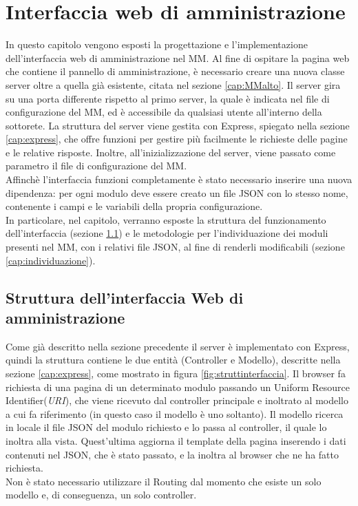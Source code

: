\chapter{Interfaccia web di amministrazione}\label{capitolo5}
In questo capitolo vengono esposti la progettazione e l'implementazione dell'interfaccia web di amministrazione
nel MM.
Al fine di ospitare la pagina web che contiene il pannello di amministrazione, \`e necessario
creare una nuova classe server oltre a quella gi\`a esistente, citata nel sezione \ref{cap:MMalto}.
Il server gira su una porta differente rispetto al primo server, la quale è indicata nel file di configurazione del MM,
ed \`e accessibile da qualsiasi utente all'interno della sottorete.
La struttura del server viene gestita con Express, spiegato nella sezione \ref{cap:express}, che offre funzioni per gestire
pi\`u facilmente le richieste delle pagine e le relative risposte.
Inoltre, all'inizializzazione del server, viene passato come parametro il file di configurazione del
MM.\\
Affinch\`e l'interfaccia funzioni completamente \`e stato necessario inserire una nuova dipendenza:
per ogni modulo deve essere creato un file JSON con lo stesso nome,
contenente i campi e le variabili della propria configurazione.\\
In particolare, nel capitolo, verranno esposte la struttura del funzionamento dell'interfaccia (sezione \ref{cap:strutturainterfaccia}) e le metodologie per
l'individuazione dei moduli
presenti nel MM, con i relativi file JSON, al fine di renderli modificabili (sezione \ref{cap:individuazione}).\\[1\baselineskip]

\section{Struttura dell'interfaccia Web di amministrazione}\label{cap:strutturainterfaccia}
Come gi\`a descritto nella sezione precedente il server \`e implementato con Express, quindi la struttura
contiene le due entit\`a (Controller e Modello), descritte nella sezione \ref{cap:express}, come mostrato
in figura \ref{fig:struttinterfaccia}.
Il browser fa richiesta di una pagina di un determinato modulo passando un Uniform Resource Identifier(\textit{URI}),
che viene ricevuto dal controller principale e inoltrato al modello a cui fa riferimento (in questo caso il modello
\`e uno soltanto). Il modello ricerca in locale il file JSON del modulo richiesto e lo passa al controller, il quale lo inoltra alla vista.
Quest'ultima aggiorna il template della pagina inserendo i dati contenuti nel JSON, che \`e stato passato, e la inoltra al browser che ne ha fatto richiesta.\\
Non \`e stato necessario utilizzare il Routing dal momento che esiste un solo modello e, di conseguenza, un solo controller.\\[1\baselineskip]

